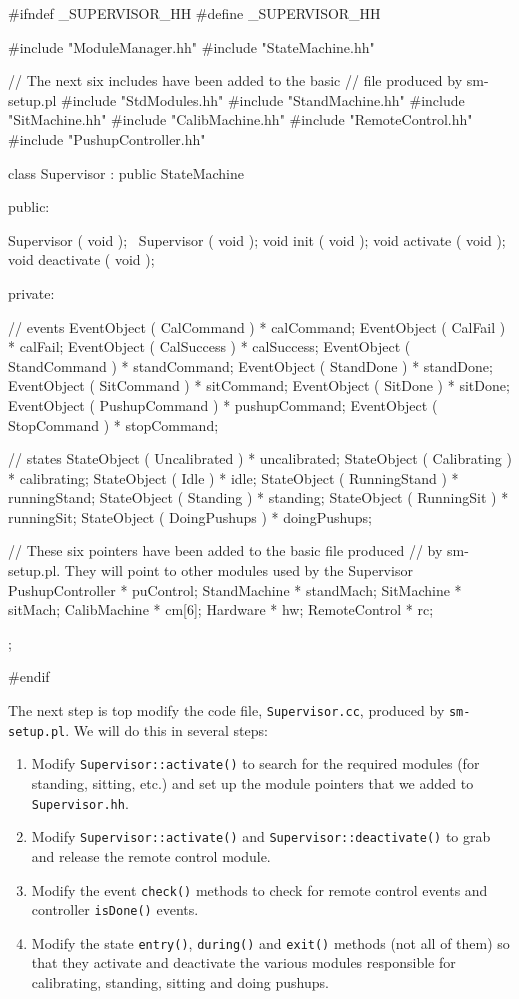 \begin{codesegment}
#ifndef _SUPERVISOR_HH
#define _SUPERVISOR_HH

#include "ModuleManager.hh"
#include "StateMachine.hh"

// The next six includes have been added to the basic
// file produced by sm-setup.pl
#include "StdModules.hh"
#include "StandMachine.hh"
#include "SitMachine.hh"
#include "CalibMachine.hh"
#include "RemoteControl.hh"
#include "PushupController.hh"

class Supervisor : public StateMachine {

  public:

    Supervisor ( void );
    ~Supervisor ( void );
    void init ( void );
    void activate ( void );
    void deactivate ( void );

  private:

    // events
    EventObject ( CalCommand ) * calCommand;
    EventObject ( CalFail ) * calFail;
    EventObject ( CalSuccess ) * calSuccess;
    EventObject ( StandCommand ) * standCommand;
    EventObject ( StandDone ) * standDone;
    EventObject ( SitCommand ) * sitCommand;
    EventObject ( SitDone ) * sitDone;
    EventObject ( PushupCommand ) * pushupCommand;
    EventObject ( StopCommand ) * stopCommand;

    // states
    StateObject ( Uncalibrated ) * uncalibrated;
    StateObject ( Calibrating ) * calibrating;
    StateObject ( Idle ) * idle;
    StateObject ( RunningStand ) * runningStand;
    StateObject ( Standing ) * standing;
    StateObject ( RunningSit ) * runningSit;
    StateObject ( DoingPushups ) * doingPushups;

    // These six pointers have been added to the basic file produced
    // by sm-setup.pl. They will point to other modules used by the Supervisor
    PushupController * puControl;
    StandMachine     * standMach;
    SitMachine       * sitMach;
    CalibMachine     * cm[6];
    Hardware         * hw;
    RemoteControl    * rc;

};

#endif
\end{codesegment}

The next step is top modify the code file, {\tt Supervisor.cc}, produced by
{\tt sm-setup.pl}. We will do this in several steps:
\begin{enumerate}
\item Modify {\tt Supervisor::activate()} to search for the required modules
(for standing, sitting, etc.) and set up the module pointers that we added to
{\tt Supervisor.hh}.
\item Modify {\tt Supervisor::activate()} and {\tt Supervisor::deactivate()} to
grab and release the remote control module.
\item Modify the event {\tt check()} methods to check for remote control events
and controller {\tt isDone()} events.
\item Modify the state {\tt entry()}, {\tt during()} and {\tt exit()} methods
(not all of them) so that they activate and deactivate the various modules
responsible for calibrating, standing, sitting and doing pushups.
\end{enumerate}

